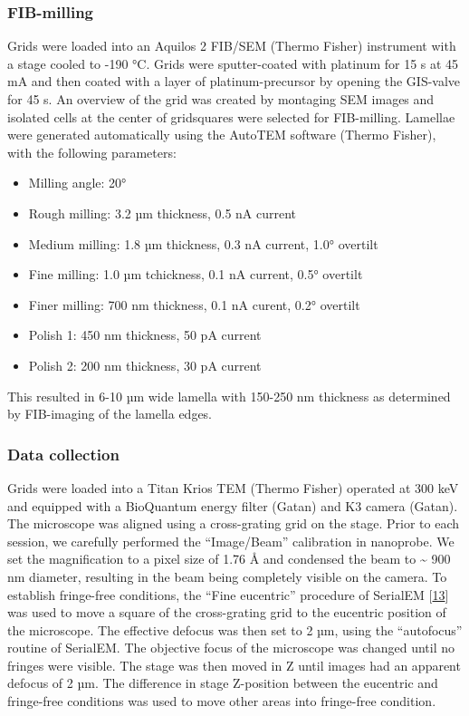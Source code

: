 \documentclass[
]{article}
\providecommand{\tightlist}{%
  \setlength{\itemsep}{0pt}\setlength{\parskip}{0pt}}
\begin{document}
\hypertarget{fib-milling}{%
\subsubsection{FIB-milling}\label{fib-milling}}

Grids were loaded into an Aquilos 2 FIB/SEM (Thermo Fisher) instrument with a
stage cooled to -190 °C. Grids were sputter-coated with platinum for 15 s at 45 mA
and then coated with a layer of platinum-precursor by opening the GIS-valve for
45 s. An overview of the grid was created by montaging SEM images and isolated
cells at the center of gridsquares were selected for FIB-milling. Lamellae were
generated automatically using the AutoTEM software (Thermo Fisher), with the
following parameters:

\begin{itemize}
\tightlist
\item
  Milling angle: 20°
\item
  Rough milling: 3.2 µm thickness, 0.5 nA current
\item
  Medium milling: 1.8 µm thickness, 0.3 nA current, 1.0° overtilt
\item
  Fine milling: 1.0 µm tchickness, 0.1 nA current, 0.5° overtilt
\item
  Finer milling: 700 nm thickness, 0.1 nA curent, 0.2° overtilt
\item
  Polish 1: 450 nm thickness, 50 pA current
\item
  Polish 2: 200 nm thickness, 30 pA current
\end{itemize}

This resulted in 6-10 µm wide lamella with 150-250 nm thickness as determined by
FIB-imaging of the lamella edges.

\hypertarget{data-collection}{%
\subsubsection{Data collection}\label{data-collection}}

Grids were loaded into a Titan Krios TEM (Thermo Fisher) operated at 300 keV and
equipped with a BioQuantum energy filter (Gatan) and K3 camera (Gatan). The
microscope was aligned using a cross-grating grid on the stage. Prior to each
session, we carefully performed the ``Image/Beam'' calibration in nanoprobe. We
set the magnification to a pixel size of 1.76 Å and condensed the beam to \textasciitilde{} 900 nm
diameter, resulting in the beam being completely visible on the camera. To
establish fringe-free conditions, the ``Fine eucentric'' procedure of SerialEM {[}\protect\hyperlink{ref-19ZFerhph}{13}{]} was
used to move a square of the cross-grating grid to the eucentric position of the
microscope. The effective defocus was then set to 2 µm, using the ``autofocus''
routine of SerialEM. The objective focus of the microscope was changed until no
fringes were visible. The stage was then moved in Z until images had an apparent
defocus of 2 µm. The difference in stage Z-position between the eucentric and
fringe-free conditions was used to move other areas into fringe-free condition.
\end{document}
